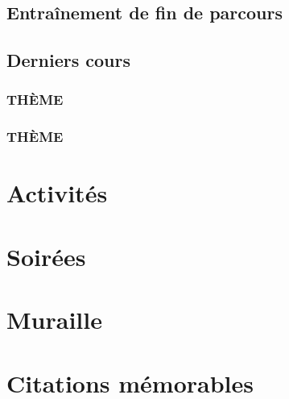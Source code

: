 \documentclass[poly,trombi]{valbonne}
\begin{document}
\section{Entraînement de fin de parcours}


\section{Derniers cours}

\subsection{THÈME}


\subsection{THÈME}



\chapter{Activités}


\chapter{\hspace{2mm}Soirées}

\minitoc \clearpage














\chapter{Muraille}


\newpage





\chapter{Citations mémorables}

\end{document}
